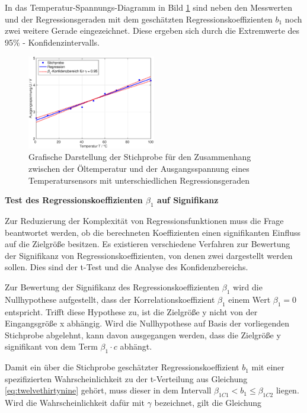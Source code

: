 \noindent In das Temperatur-Spannungs-Diagramm in Bild \ref{fig:RegressionLinearOeltemperatur3} sind neben den Messwerten und der Regressionsgeraden mit dem gesch\"{a}tzten Regressionskoeffizienten $b_{1}$ noch zwei weitere Gerade eingezeichnet. Diese ergeben sich durch die Extremwerte des 95\% - Konfidenzintervalls.

\noindent 
\begin{figure}[H]
  \centerline{\includegraphics[width=0.5\textwidth]{Kapitel12/Bilder/image6}}
  \caption{Grafische Darstellung der Stichprobe f\"{u}r den Zusammenhang zwischen der \"{O}ltemperatur und der Ausgangsspannung eines Temperatursensors mit unterschiedlichen Regressionsgeraden}
  \label{fig:RegressionLinearOeltemperatur3}
\end{figure}

\selectfont
\noindent\textbf{Test des Regressionskoeffizienten $\beta_{1}$ auf Signifikanz}\smallskip

\noindent Zur Reduzierung der Komplexit\"{a}t von Regressionsfunktionen muss die Frage beantwortet werden, ob die berechneten Koeffizienten einen signifikanten Einfluss auf die Zielgr\"{o}{\ss}e besitzen. Es existieren verschiedene Verfahren zur Bewertung der Signifikanz von Regressionskoeffizienten, von denen zwei dargestellt werden sollen. Dies sind der t-Test und die Analyse des Konfidenzbereichs.\newline

\noindent Zur Bewertung der Signifikanz des Regressionskoeffizienten $\beta_{1}$ wird die Nullhypothese aufgestellt, dass der Korrelationskoeffizient $\beta_{1}$ einem Wert $\beta_{1}= 0$  entspricht. Trifft diese Hypothese zu, ist die Zielgr\"{o}{\ss}e y nicht von der Eingangsgr\"{o}{\ss}e x abh\"{a}ngig. Wird die Nullhypothese auf Basis der vorliegenden Stichprobe abgelehnt, kann davon ausgegangen werden, dass die Zielgr\"{o}{\ss}e y signifikant von dem Term $\beta_{1}\cdot c$ abh\"{a}ngt.\newline

\noindent Damit ein \"{u}ber die Stichprobe gesch\"{a}tzter Regressionskoeffizient $b_{1}$ mit einer spezifizierten Wahrscheinlichkeit zu der t-Verteilung aus Gleichung \eqref{eq:twelvethirtynine} geh\"{o}rt, muss dieser in dem Intervall $\beta_{1C1} < b_{1} \leq \beta_{1C2}$ liegen. Wird die Wahrscheinlichkeit daf\"{u}r mit $\gamma$ bezeichnet, gilt die Gleichung

